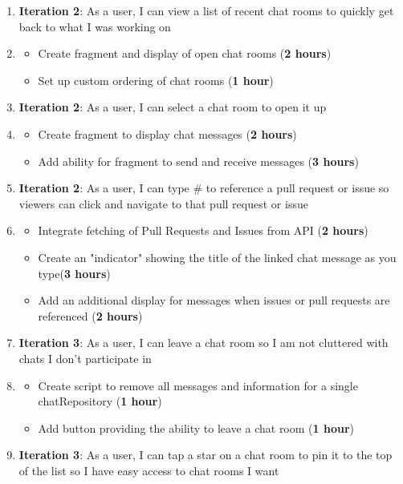 \documentclass{report}
\begin{document}
\begin{enumerate}
    \item \textbf{Iteration 2}: As a user, I can view a list of recent chat rooms to quickly get back to what I was working on
    \item[] \begin{itemize}
        \item Create fragment and display of open chat rooms (\textbf{2 hours})
        \item Set up custom ordering of chat rooms (\textbf{1 hour})
    \end{itemize}
    \item \textbf{Iteration 2}: As a user, I can select a chat room to open it up
    \item[] \begin{itemize}
        \item Create fragment to display chat messages (\textbf{2 hours})
        \item Add ability for fragment to send and receive messages (\textbf{3 hours})
    \end{itemize}
    \item \textbf{Iteration 2}: As a user, I can type \# to reference a pull request or issue so viewers can click and navigate to that pull request or issue
    \item[] \begin{itemize}
        \item Integrate fetching of Pull Requests and Issues from API (\textbf{2 hours})
        \item Create an "indicator" showing the title of the linked chat message as you type(\textbf{3 hours})
        \item Add an additional display for messages when issues or pull requests are referenced (\textbf{2 hours})
    \end{itemize}
    \item \textbf{Iteration 3}: As a user, I can leave a chat room so I am not cluttered with chats I don't participate in
    \item[] \begin{itemize}
        \item Create script to remove all messages and information for a single chatRepository (\textbf{1 hour})
        \item Add button providing the ability to leave a chat room (\textbf{1 hour})
    \end{itemize}
    \item \textbf{Iteration 3}: As a user, I can tap a star on a chat room to pin it to the top of the list so I have easy access to chat rooms I want

\end{enumerate}
\end{document}
